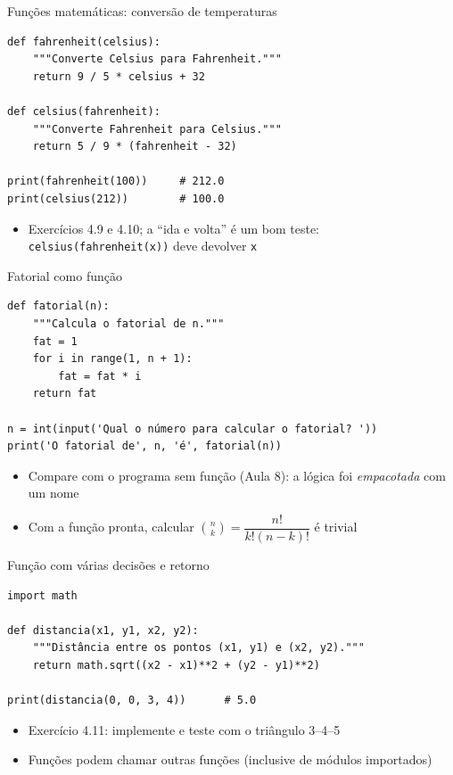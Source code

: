 \documentclass[aspectratio=169,10pt,t]{beamer}
\begin{document}
\begin{frame}[fragile]{Funções matemáticas: conversão de temperaturas}
\begin{lstlisting}
def fahrenheit(celsius):
    """Converte Celsius para Fahrenheit."""
    return 9 / 5 * celsius + 32

def celsius(fahrenheit):
    """Converte Fahrenheit para Celsius."""
    return 5 / 9 * (fahrenheit - 32)

print(fahrenheit(100))     # 212.0
print(celsius(212))        # 100.0
\end{lstlisting}
  \begin{itemize}
    \item Exercícios 4.9 e 4.10; a ``ida e volta'' é um bom teste: \texttt{celsius(fahrenheit(x))} deve devolver \texttt{x}
  \end{itemize}
\end{frame}

\begin{frame}[fragile]{Fatorial como função}
\begin{lstlisting}
def fatorial(n):
    """Calcula o fatorial de n."""
    fat = 1
    for i in range(1, n + 1):
        fat = fat * i
    return fat

n = int(input('Qual o número para calcular o fatorial? '))
print('O fatorial de', n, 'é', fatorial(n))
\end{lstlisting}
  \begin{itemize}
    \item Compare com o programa sem função (Aula 8): a lógica foi \emph{empacotada} com um nome
    \item Com a função pronta, calcular \(\binom{n}{k}=\dfrac{n!}{k!(n-k)!}\) é trivial
  \end{itemize}
\end{frame}

\begin{frame}[fragile]{Função com várias decisões e retorno}
\begin{lstlisting}
import math

def distancia(x1, y1, x2, y2):
    """Distância entre os pontos (x1, y1) e (x2, y2)."""
    return math.sqrt((x2 - x1)**2 + (y2 - y1)**2)

print(distancia(0, 0, 3, 4))      # 5.0
\end{lstlisting}
  \begin{itemize}
    \item Exercício 4.11: implemente e teste com o triângulo 3--4--5
    \item Funções podem chamar outras funções (inclusive de módulos importados)
  \end{itemize}
\end{frame}
\end{document}
